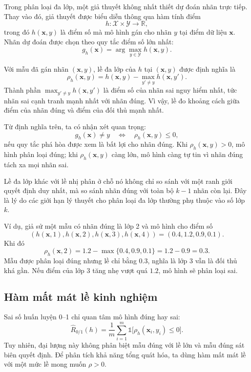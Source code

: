 Trong phân loại đa lớp, một giả thuyết không nhất thiết dự đoán nhãn trực tiếp. Thay vào đó, giả thuyết được biểu diễn thông qua hàm tính điểm
\[
  h:\mathcal{X}\times\mathcal{Y}\to\mathbb{R},
\]
trong đó $h(\bm{x},y)$ là điểm số mà mô hình gán cho nhãn $y$ tại điểm dữ liệu $\bm{x}$. Nhãn dự đoán được chọn theo quy tắc điểm số lớn nhất:
\[
  g_h(\bm{x})=\arg\max_{y\in\mathcal{Y}}h(\bm{x},y).
\]

Với mẫu đã gán nhãn $(\bm{x},y)$, lề đa lớp của $h$ tại $(\bm{x},y)$ được định nghĩa là
\[
  \rho_h(\bm{x},y)=h(\bm{x},y)-\max_{y'\neq y}h(\bm{x},y').
\]
Thành phần $\max_{y'\neq y}h(\bm{x},y')$ là điểm số của nhãn sai nguy hiểm nhất, tức nhãn sai cạnh tranh mạnh nhất với nhãn đúng. Vì vậy, lề đo khoảng cách giữa điểm của nhãn đúng và điểm của đối thủ mạnh nhất.

Từ định nghĩa trên, ta có nhận xét quan trọng:
\[
  g_h(\bm{x})\neq y \quad \Longleftrightarrow \quad \rho_h(\bm{x},y)\leq 0,
\]
nếu quy tắc phá hòa được xem là bất lợi cho nhãn đúng. Khi $\rho_h(\bm{x},y)>0$, mô hình phân loại đúng; khi $\rho_h(\bm{x},y)$ càng lớn, mô hình càng tự tin vì nhãn đúng tách xa mọi nhãn sai.

\begin{notebox}
Lề đa lớp khác với lề nhị phân ở chỗ nó không chỉ so sánh với một ranh giới quyết định duy nhất, mà so sánh nhãn đúng với toàn bộ $k-1$ nhãn còn lại. Đây là lý do các giới hạn lý thuyết cho phân loại đa lớp thường phụ thuộc vào số lớp $k$.
\end{notebox}

Ví dụ, giả sử một mẫu có nhãn đúng là lớp 2 và mô hình cho điểm số
\[
  (h(\bm{x},1),h(\bm{x},2),h(\bm{x},3),h(\bm{x},4))=(0.4,1.2,0.9,0.1).
\]
Khi đó
\[
  \rho_h(\bm{x},2)=1.2-\max\{0.4,0.9,0.1\}=1.2-0.9=0.3.
\]
Mẫu được phân loại đúng nhưng lề chỉ bằng $0.3$, nghĩa là lớp 3 vẫn là đối thủ khá gần. Nếu điểm của lớp 3 tăng nhẹ vượt quá $1.2$, mô hình sẽ phân loại sai.

\subsection{Hàm mất mát lề kinh nghiệm}

Sai số huấn luyện 0--1 chỉ quan tâm mô hình đúng hay sai:
\[
  \widehat{R}_{0/1}(h)=\frac{1}{m}\sum_{i=1}^{m}\mathbb{1}\bigl[\rho_h(\bm{x}_i,y_i)\leq 0\bigr].
\]
Tuy nhiên, đại lượng này không phân biệt mẫu đúng với lề lớn và mẫu đúng sát biên quyết định. Để phân tích khả năng tổng quát hóa, ta dùng hàm mất mát lề với một mức lề mong muốn $\rho>0$.

